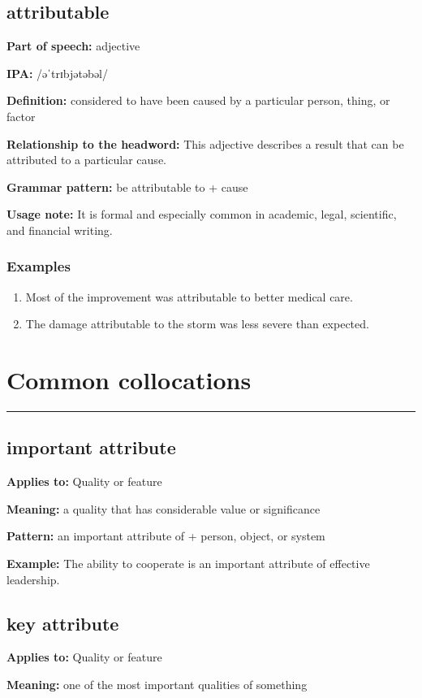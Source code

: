 \documentclass[11pt]{article}
\newcommand{\sectionrule}{\par\vspace{-0.5em}\noindent\textcolor{Accent}{\rule{\linewidth}{0.6pt}}\par}
\begin{document}
\subsection{attributable}
\textbf{Part of speech:} adjective

\textbf{IPA:} /əˈtrɪbjətəbəl/

\textbf{Definition:} considered to have been caused by a particular person, thing, or factor

\textbf{Relationship to the headword:} This adjective describes a result that can be attributed to a particular cause.

\textbf{Grammar pattern:} be attributable to + cause

\textbf{Usage note:} It is formal and especially common in academic, legal, scientific, and financial writing.

\subsubsection{Examples}
\begin{enumerate}
  \item Most of the improvement was attributable to better medical care.
  \item The damage attributable to the storm was less severe than expected.
\end{enumerate}

\section{Common collocations}
\sectionrule
\subsection{important attribute}
\textbf{Applies to:} Quality or feature

\textbf{Meaning:} a quality that has considerable value or significance

\textbf{Pattern:} an important attribute of + person, object, or system

\textbf{Example:} The ability to cooperate is an important attribute of effective leadership.

\subsection{key attribute}
\textbf{Applies to:} Quality or feature

\textbf{Meaning:} one of the most important qualities of something
\end{document}
